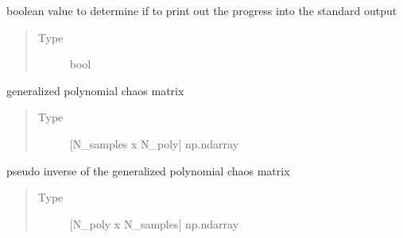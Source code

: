 \documentclass[letterpaper,10pt,english,openany,oneside]{sphinxmanual}
\begin{document}
\begin{fulllineitems}
\begin{fulllineitems}
\begin{quote}
\begin{description}
\end{description}\end{quote}

\end{fulllineitems}


\begin{fulllineitems}
\label{\detokenize{pygpc:pygpc.gpc.gPC.verbose}}
boolean value to determine if to print out the progress into the standard output
\begin{quote}\begin{description}
\item[{Type}] \leavevmode
bool

\end{description}\end{quote}

\end{fulllineitems}


\begin{fulllineitems}
\label{\detokenize{pygpc:pygpc.gpc.gPC.gpc_matrix}}
generalized polynomial chaos matrix
\begin{quote}\begin{description}
\item[{Type}] \leavevmode
{[}N\_samples x N\_poly{]} np.ndarray

\end{description}\end{quote}

\end{fulllineitems}


\begin{fulllineitems}
\label{\detokenize{pygpc:pygpc.gpc.gPC.gpc_matrix_inv}}
pseudo inverse of the generalized polynomial chaos matrix
\begin{quote}\begin{description}
\item[{Type}] \leavevmode
{[}N\_poly x N\_samples{]} np.ndarray

\end{description}\end{quote}


\end{fulllineitems}
\end{fulllineitems}
\end{document}
